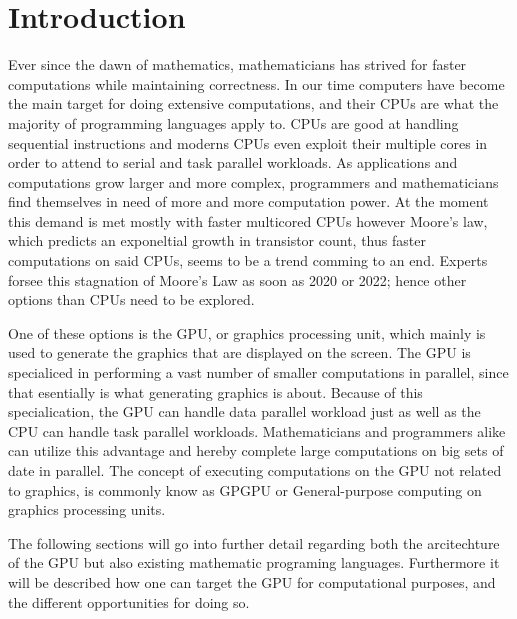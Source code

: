 \chapter{Introduction} %
\label{cha:introduction}
Ever since the dawn of mathematics, mathematicians has strived for faster computations while maintaining correctness.
In our time computers have become the main target for doing extensive computations, and their CPUs are what the majority of programming languages apply to.
CPUs are good at handling sequential instructions and moderns CPUs even exploit their multiple cores in order to attend to serial and task parallel workloads.
As applications and computations grow larger and more complex, programmers and mathematicians find themselves in need of more and more computation power.
At the moment this demand is met mostly with faster multicored CPUs however Moore's law, which predicts an exponeltial growth in transistor count, thus faster computations on said CPUs, seems to be a trend comming to an end.
Experts forsee this stagnation of Moore's Law as soon as 2020 or 2022; hence other options than CPUs need to be explored.\citep{Moore2013}

One of these options is the GPU, or graphics processing unit, which mainly is used to generate the graphics that are displayed on the screen.
The GPU is specialiced in performing a vast number of smaller computations in parallel, since that esentially is what generating graphics is about.
Because of this specialication, the GPU can handle data parallel workload just as well as the CPU can handle task parallel workloads.
Mathematicians and programmers alike can utilize this advantage and hereby complete large computations on big sets of date in parallel.
The concept of executing computations on the GPU not related to graphics, is commonly know as GPGPU or General-purpose computing on graphics processing units. 

The following sections will go into further detail regarding both the arcitechture of the GPU but also existing mathematic programing languages.
Furthermore it will be described how one can target the GPU for computational purposes, and the different opportunities for doing so. 





